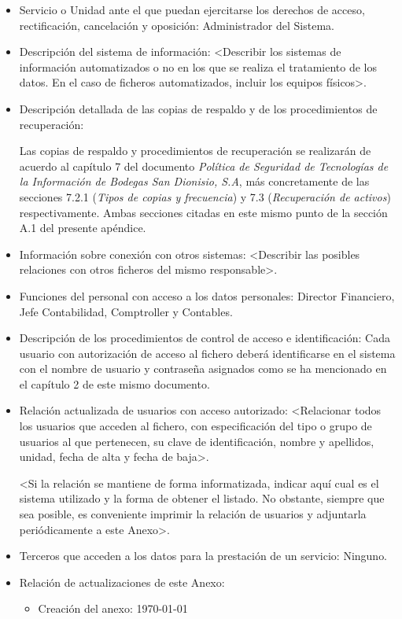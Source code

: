 \documentclass[a4paper,11pt,bibtotoc,noliststotoc]{scrbook}
\begin{document}
\begin{itemize}
\item Servicio o Unidad ante el que puedan ejercitarse los derechos de acceso, rectificación, cancelación y oposición: Administrador del Sistema.

\item Descripción del sistema de información: <Describir los sistemas de información automatizados o no en los que se realiza el tratamiento de los datos. En el caso de ficheros automatizados, incluir los equipos físicos>.

\item Descripción detallada de las copias de respaldo y de los procedimientos de recuperación:

Las copias de respaldo y procedimientos de recuperación se realizarán de acuerdo al capítulo 7 del documento \emph{Política de Seguridad de Tecnologías de la Información de Bodegas San Dionisio, S.A}, más concretamente de las secciones 7.2.1 (\emph{Tipos de copias y frecuencia}) y 7.3 (\emph{Recuperación de activos}) respectivamente. Ambas secciones citadas en este mismo punto de la sección A.1 del presente apéndice.

\item Información sobre conexión con otros sistemas: <Describir las posibles relaciones con otros ficheros del mismo responsable>.

\item Funciones del personal con acceso a los datos personales: Director Financiero, Jefe Contabilidad, Comptroller y Contables.

\item Descripción de los procedimientos de control de acceso e identificación: Cada usuario con autorización de acceso al fichero deberá identificarse en el sistema con el nombre de usuario y contraseña asignados como se ha mencionado en el capítulo 2 de este mismo documento.

\item Relación actualizada de usuarios con acceso autorizado: <Relacionar todos los usuarios que acceden al fichero, con especificación del tipo o grupo de usuarios al que pertenecen, su clave de identificación, nombre y apellidos, unidad, fecha de alta y fecha de baja>.

<Si la relación se mantiene de forma informatizada, indicar aquí cual es el sistema utilizado y la forma de obtener el listado. No obstante, siempre que sea posible, es conveniente imprimir la relación de usuarios y adjuntarla periódicamente a este Anexo>.

\item Terceros que acceden a los datos para la prestación de un servicio: Ninguno.

\item Relación de actualizaciones de este Anexo: 

	\begin{itemize}
	\item Creación del anexo: \today
	\end{itemize}

\end{itemize}
\end{document}
